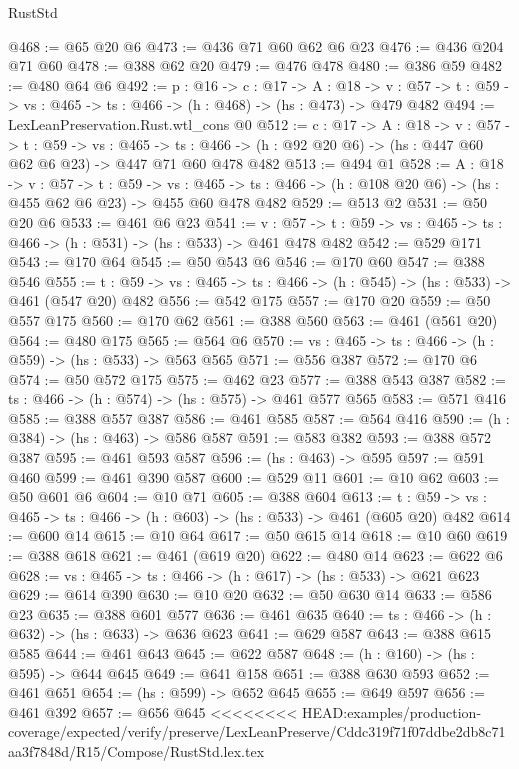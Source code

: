 \begin{lexlean}{RustStd}
\begin{coremodule}
{\begin{coremodule}
@468 := @65 @20 @6
@473 := @436 @71 @60 @62 @6 @23
@476 := @436 @204 @71 @60
@478 := @388 @62 @20
@479 := @476 @478
@480 := @386 @59
@482 := @480 @64 @6
@492 := {p : @16} ->
  {c : @17} ->
  {A : @18} ->
  {v : @57} -> {t : @59} -> {vs : @465} -> {ts : @466} -> (h : @468) -> (hs : @473) -> @479 @482
@494 := LexLeanPreservation.Rust.wtl_cons @0
@512 := {c : @17} ->
  {A : @18} ->
  {v : @57} ->
  {t : @59} ->
  {vs : @465} ->
  {ts : @466} -> (h : @92 @20 @6) -> (hs : @447 @60 @62 @6 @23) -> @447 @71 @60 @478 @482
@513 := @494 @1
@528 := {A : @18} ->
  {v : @57} ->
  {t : @59} ->
  {vs : @465} -> {ts : @466} -> (h : @108 @20 @6) -> (hs : @455 @62 @6 @23) -> @455 @60 @478 @482
@529 := @513 @2
@531 := @50 @20 @6
@533 := @461 @6 @23
@541 := {v : @57} ->
  {t : @59} -> {vs : @465} -> {ts : @466} -> (h : @531) -> (hs : @533) -> @461 @478 @482
@542 := @529 @171
@543 := @170 @64
@545 := @50 @543 @6
@546 := @170 @60
@547 := @388 @546
@555 := {t : @59} -> {vs : @465} -> {ts : @466} -> (h : @545) -> (hs : @533) -> @461 (@547 @20) @482
@556 := @542 @175
@557 := @170 @20
@559 := @50 @557 @175
@560 := @170 @62
@561 := @388 @560
@563 := @461 (@561 @20)
@564 := @480 @175
@565 := @564 @6
@570 := {vs : @465} -> {ts : @466} -> (h : @559) -> (hs : @533) -> @563 @565
@571 := @556 @387
@572 := @170 @6
@574 := @50 @572 @175
@575 := @462 @23
@577 := @388 @543 @387
@582 := {ts : @466} -> (h : @574) -> (hs : @575) -> @461 @577 @565
@583 := @571 @416
@585 := @388 @557 @387
@586 := @461 @585
@587 := @564 @416
@590 := (h : @384) -> (hs : @463) -> @586 @587
@591 := @583 @382
@593 := @388 @572 @387
@595 := @461 @593 @587
@596 := (hs : @463) -> @595
@597 := @591 @460
@599 := @461 @390 @587
@600 := @529 @11
@601 := @10 @62
@603 := @50 @601 @6
@604 := @10 @71
@605 := @388 @604
@613 := {t : @59} -> {vs : @465} -> {ts : @466} -> (h : @603) -> (hs : @533) -> @461 (@605 @20) @482
@614 := @600 @14
@615 := @10 @64
@617 := @50 @615 @14
@618 := @10 @60
@619 := @388 @618
@621 := @461 (@619 @20)
@622 := @480 @14
@623 := @622 @6
@628 := {vs : @465} -> {ts : @466} -> (h : @617) -> (hs : @533) -> @621 @623
@629 := @614 @390
@630 := @10 @20
@632 := @50 @630 @14
@633 := @586 @23
@635 := @388 @601 @577
@636 := @461 @635
@640 := {ts : @466} -> (h : @632) -> (hs : @633) -> @636 @623
@641 := @629 @587
@643 := @388 @615 @585
@644 := @461 @643
@645 := @622 @587
@648 := (h : @160) -> (hs : @595) -> @644 @645
@649 := @641 @158
@651 := @388 @630 @593
@652 := @461 @651
@654 := (hs : @599) -> @652 @645
@655 := @649 @597
@656 := @461 @392
@657 := @656 @645
<<<<<<<< HEAD:examples/production-coverage/expected/verify/preserve/LexLeanPreserve/Cddc319f71f07ddbe2db8c71aa3f7848d/R15/Compose/RustStd.lex.tex

\end{coremodule}}
\end{coremodule}
\end{lexlean}
